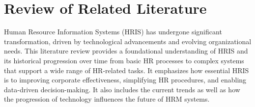 


\section{Review of Related Literature}
    Human Resource Information Systems (HRIS) has undergone significant transformation, driven by technological advancements and evolving organizational needs. This literature review provides a foundational understanding of HRIS and its historical progression over time from basic HR processes to complex systems that support a wide range of HR-related tasks. It emphasizes how essential HRIS is to improving corporate effectiveness, simplifying HR procedures, and enabling data-driven decision-making. It also includes the current trends as well as how the progression of technology influences the future of HRM systems.
    
        
